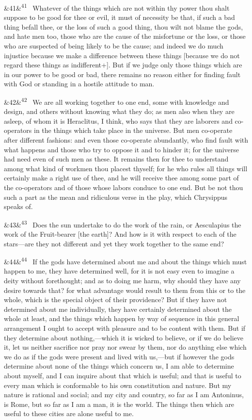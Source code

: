 \documentclass[12pt]{article}
\newcommand{\para}[1][]{\par\noindent\ifx&#1&\else\textsuperscript{\footnotesize #1}~\fi}
\begin{document}
\para[41] Whatever of the things which are not within thy power thou shalt
suppose to be good for thee or evil, it must of necessity be that, if
such a bad thing befall thee, or the loss of such a good thing, thou
wilt not blame the gods, and hate men too, those who are the cause of
the misfortune or the loss, or those who are suspected of being likely
to be the cause; and indeed we do much injustice because we make a
difference between these things [because we do not regard these things
as indifferent+]. But if we judge only those things which are in our
power to be good or bad, there remains no reason either for finding
fault with God or standing in a hostile attitude to man.

\para[42] We are all working together to one end, some with knowledge and
design, and others without knowing what they do; as men also when they
are asleep, of whom it is Heraclitus, I think, who says that they are
laborers and co-operators in the things which take place in the
universe. But men co-operate after different fashions: and even those
co-operate abundantly, who find fault with what happens and those who
try to oppose it and to hinder it; for the universe had need even of
such men as these. It remains then for thee to understand among what
kind of workmen thou placest thyself; for he who rules all things will
certainly make a right use of thee, and he will receive thee among some
part of the co-operators and of those whose labors conduce to one end.
But be not thou such a part as the mean and ridiculous verse in the
play, which Chrysippus speaks of.

\para[43] Does the sun undertake to do the work of the rain, or Aesculapius
the work of the Fruit-bearer [the earth]? And how is it with respect to
each of the stars---are they not different and yet they work together to
the same end?

\para[44] If the gods have determined about me and about the things which must
happen to me, they have determined well, for it is not easy even to
imagine a deity without forethought; and as to doing me harm, why
should they have any desire towards that? for what advantage would
result to them from this or to the whole, which is the special object of
their providence? But if they have not determined about me individually,
they have certainly determined about the whole at least, and the things
which happen by way of sequence in this general arrangement I ought to
accept with pleasure and to be content with them. But if they determine
about nothing,---which it is wicked to believe, or if we do believe it,
let us neither sacrifice nor pray nor swear by them, nor do anything
else which we do as if the gods were present and lived with us,---but if
however the gods determine about none of the things which concern us, I
am able to determine about myself, and I can inquire about that which is
useful; and that is useful to every man which is conformable to his own
constitution and nature. But my nature is rational and social; and my
city and country, so far as I am Antoninus, is Rome, but so far as I am
a man, it is the world. The things then which are useful to these cities
are alone useful to me.
\end{document}
